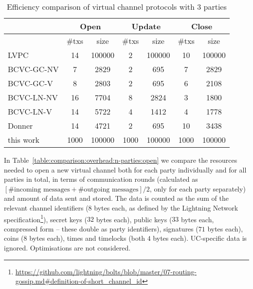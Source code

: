   \begin{table*}
    \caption{Efficiency comparison of virtual channel protocols with $3$
    parties}
    \label{table:comparison:overhead:3-parties}
    \begin{minipage}{\textwidth}
    \begin{center}
    \begin{tabular}{|l|c|c|c|c|c|c|}
    \hline
              & \multicolumn{2}{|c|}{Open} & \multicolumn{2}{|c|}{Update} &
              \multicolumn{2}{|c|}{Close} \\
    \hline
              & \#txs & size & \#txs & size & \#txs & size \\
    \hline
    LVPC       & 14 & 100000 & 2 & 100000 & 10 & 100000 \\
    \hline
    BCVC-GC-NV
              & 7 & 2829 & 2 & 695 & 7 & 2829 \\
    \hline
    BCVC-GC-V & 8 & 2803 & 2 & 695 & 6 & 2108 \\
    \hline
    BCVC-LN-NV
              & 16 & 7704 & 8 & 2824 & 3 & 1800 \\
    \hline
    BCVC-LN-V & 14 & 5722 & 4 & 1412 & 4 & 1778 \\
    \hline
    Donner    & 14 & 4721 & 2 & 695 & 10 & 3438 \\
    \hline
    this work & 1000 & 100000 & 1000 & 100000 & 1000 & 100000 \\
    \hline
    \end{tabular}
    \end{center}
    \end{minipage}
  \end{table*}

  In Table~\ref{table:comparison:overhead:n-parties:open} we compare the
  resources needed to open a new virtual channel both for each party
  individually and for all parties in total, in terms of communication rounds
  (calculated as $[\#\text{incoming messages} + \#\text{outgoing messages}]/2$,
  only for each party separately) and amount of data sent and stored. The data
  is counted as the sum of the relevant channel identifiers ($8$ bytes each, as
  defined by the Lightning Network
  specification\footnote{\url{https://github.com/lightning/bolts/blob/master/07-routing-gossip.md\#definition-of-short_channel_id}}),
  secret keys ($32$ bytes each), public keys ($33$ bytes each, compressed form
  -- these double as party identifiers), signatures ($71$ bytes each), coins
  ($8$ bytes each), times and timelocks (both $4$ bytes each). UC-specific data
  is ignored.  
  Optimisations are not considered.


